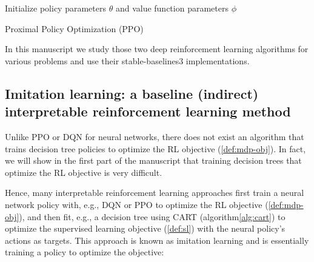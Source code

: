 \begin{algorithm}
    Initialize policy parameters $\theta$ and value function parameters $\phi$ \\
    \caption{Proximal Policy Optimization (PPO)}\label{alg:ppo}
\end{algorithm}
In this manuscript we study those two deep reinforcement learning algorithms for various problems and use their stable-baselines3 implementations\cite{stable-baselines3}.

\subsection{Imitation learning: a baseline (indirect) interpretable reinforcement learning method}\label{sec:imit}

Unlike PPO or DQN for neural networks, there does not exist an algorithm that trains decision tree policies to optimize the RL objective (\ref{def:mdp-obj}).
In fact, we will show in the first part of the manuscript that training decision trees that optimize the RL objective is very difficult.

Hence, many interpretable reinforcement learning approaches first train a neural network policy with, e.g., DQN or PPO to optimize the RL objective (\ref{def:mdp-obj}), and then fit, e.g., a decision tree using CART (algorithm\ref{alg:cart}) to optimize the supervised learning objective (\ref{def:sl}) with the neural policy's actions as targets.
This approach is known as imitation learning and is essentially training a policy to optimize the objective:

